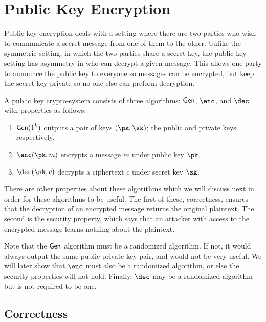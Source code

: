 \documentclass[12pt]{tufte-book}
\begin{document}

\newcommand{\fake}{\mathsf{FAKE}}

\chapter{Public Key Encryption}
Public key encryption deals with a setting where there are two parties who wish
to communicate a secret message from one of them to the other. Unlike the symmetric
setting, in which the two parties share a secret key, the public-key setting has
asymmetry in who can decrypt a given message. This allows one party to
announce the public key to everyone so messages can be encrypted, but keep the
secret key private so no one else can preform decryption.

\begin{definition}

A public key crypto-system consists of three algorithms: $\mathsf{Gen}$, $\enc$,
and $\dec$ with properties as follows:

\begin{enumerate}
\item $\mathsf{Gen}(1^k)$ outputs a pair of keys $(\pk, \sk)$; the public and private
keys respectively.

\item $\enc(\pk, m)$ encrypts a message $m$ under
public key $\pk$.

\item $\dec(\sk, c)$ decrypts a ciphertext $c$
under secret key $\sk$.
\end{enumerate}
\end{definition}

There are other properties about these algorithms which we will discuss next
in order for these algorithms to be useful. The first of these, correctness,
ensures that the decryption of an encrypted message returns the original plaintext.
The second is the security property, which says that an attacker with access
to the encrypted message learns nothing about the plaintext.

Note that the $\mathsf{Gen}$ algorithm must be a randomized algorithm. If not, it would
always output the same public-private key pair, and would not be very useful. We will
later show that $\enc$ must also be a randomized algorithm, or else the security
properties will not hold. Finally, $\dec$ may be a randomized algorithm but is not
required to be one.


\section{Correctness}
\end{document}
